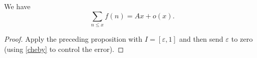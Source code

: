 \begin{corollary}
\label{WienerIkehara}
\leanok
We have
  $$ \sum_{n\leq x} f(n) = A x + o(x).$$
\end{corollary}
\begin{proof}
\leanok
Apply the preceding proposition with $I = [\varepsilon,1]$ and then send
  $\varepsilon$ to zero (using \eqref{cheby} to control the error).
\end{proof}
